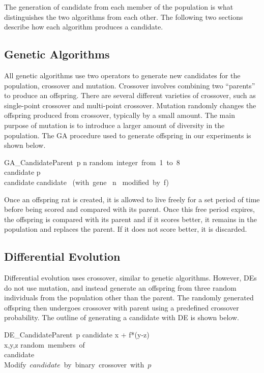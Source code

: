 \documentclass{sig-alternate}
\begin{document}
The generation of candidate from each member of the population is what distinguishes the two algorithms from each other.  The following two sections describe how each algorithm produces a candidate.

\subsection{Genetic Algorithms}
All genetic algorithms use two operators to generate new candidates for the population, crossover and mutation.\cite{Konak:GA}  Crossover involves combining two ``parents'' to produce an offspring.  There are several different varieties of crossover, such as single-point crossover and multi-point crossover.  Mutation randomly changes the offspring produced from crossover, typically by a small amount.  The main purpose of mutation is to introduce a larger amount of diversity in the population.  The GA procedure used to generate offspring in our experiments is shown below.\cite{Konak:GA}

\begin{pseudocode}{GA\_Candidate}{\mbox{Parent p}}
n \GETS \mbox{random integer from 1 to 8}\\
candidate \GETS p\\
candidate \GETS candidate \mbox{ (with gene } n \mbox{ modified by f)}\\
\end{pseudocode}

Once an offspring rat is created, it is allowed to live freely for a set period of time before being scored and compared with its parent.  Once this free period expires, the offspring is compared with its parent and if it scores better, it remains in the population and replaces the parent.  If it does not score better, it is discarded.

\subsection{Differential Evolution}
Differential evolution uses crossover, similar to genetic algorithms.  However, DEs do not use mutation, and instead generate an offspring from three random individuals from the population other than the parent.  The randomly generated offspring then undergoes crossover with parent using a predefined crossover probability.  The outline of generating a candidate with DE is shown below.\cite{DEMO}

\begin{pseudocode}{DE\_Candidate}{\mbox{Parent p}}
candidate \GETS x + f*(y-z)\\
\ENDPROCEDURE
\MAIN
x,y,z \GETS \mbox{random members of }\\
candidate \GETS {}\\
\mbox{Modify $candidate$ by binary crossover with $p$}\\
\ENDMAIN
\end{pseudocode}
\end{document}
